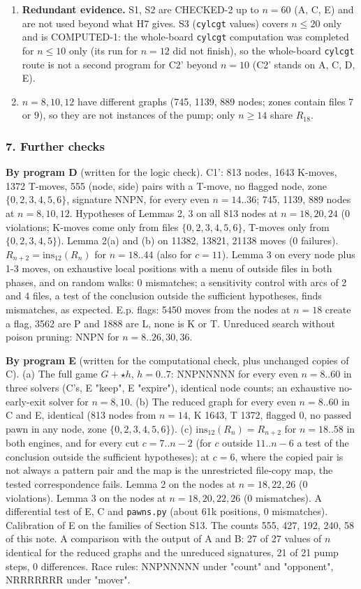 \begin{enumerate}
\item \textbf{Redundant evidence.} S1, S2 are CHECKED-2 up to $n=60$ (A, C, E) and are not used beyond what H7 gives. S3 (\texttt{cylcgt} values) covers $n\le20$ only and is COMPUTED-1: the whole-board \texttt{cylcgt} computation was completed for $n\le10$ only (its run for $n=12$ did not finish), so the whole-board \texttt{cylcgt} route is not a second program for C2' beyond $n=10$ (C2' stands on A, C, D, E).
\item $n=8,10,12$ have different graphs (745, 1139, 889 nodes; zones contain files 7 or 9), so they are not instances of the pump; only $n\ge14$ share $R_{18}$.
\end{enumerate}
\subsubsection*{7. Further checks}
\textbf{By program D} (written for the logic check). C1': 813 nodes, 1643 K-moves, 1372 T-moves, 555 (node, side) pairs with a T-move, no flagged node, zone $\{0,2,3,4,5,6\}$, signature NNPN, for every even $n=14..36$; 745, 1139, 889 nodes at $n=8,10,12$. Hypotheses of Lemmas 2, 3 on all 813 nodes at $n=18,20,24$ (0 violations; K-moves come only from files $\{0,2,3,4,5,6\}$, T-moves only from $\{0,2,3,4,5\}$). Lemma 2(a) and (b) on 11382, 13821, 21138 moves (0 failures). $R_{n+2}=\mathrm{ins}_{12}(R_n)$ for $n=18..44$ (also for $c=11$). Lemma 3 on every node plus 1-3 moves, on exhaustive local positions with a menu of outside files in both phases, and on random walks: 0 mismatches; a sensitivity control with arcs of 2 and 4 files, a test of the conclusion outside the sufficient hypotheses, finds mismatches, as expected. E.p. flags: 5450 moves from the nodes at $n=18$ create a flag, 3562 are P and 1888 are L, none is K or T. Unreduced search without poison pruning: NNPN for $n=8..26,30,36$.

\textbf{By program E} (written for the computational check, plus unchanged copies of C). (a) The full game $G+\star h$, $h=0..7$: NNPNNNNN for every even $n=8..60$ in three solvers (C's, E "keep", E "expire"), identical node counts; an exhaustive no-early-exit solver for $n=8,10$. (b) The reduced graph for every even $n=8..60$ in C and E, identical (813 nodes from $n=14$, K 1643, T 1372, flagged 0, no passed pawn in any node, zone $\{0,2,3,4,5,6\}$). (c) $\mathrm{ins}_{12}(R_n)=R_{n+2}$ for $n=18..58$ in both engines, and for every cut $c=7..n-2$ (for $c$ outside $11..n-6$ a test of the conclusion outside the sufficient hypotheses); at $c=6$, where the copied pair is not always a pattern pair and the map is the unrestricted file-copy map, the tested correspondence fails. Lemma 2 on the nodes at $n=18,22,26$ (0 violations). Lemma 3 on the nodes at $n=18,20,22,26$ (0 mismatches). A differential test of E, C and \texttt{pawns.py} (about 61k positions, 0 mismatches). Calibration of E on the families of Section S13. The counts 555, 427, 192, 240, 58 of this note. A comparison with the output of A and B: 27 of 27 values of $n$ identical for the reduced graphs and the unreduced signatures, 21 of 21 pump steps, 0 differences. Race rules: NNPNNNNN under "count" and "opponent", NRRRRRRR under "mover".

